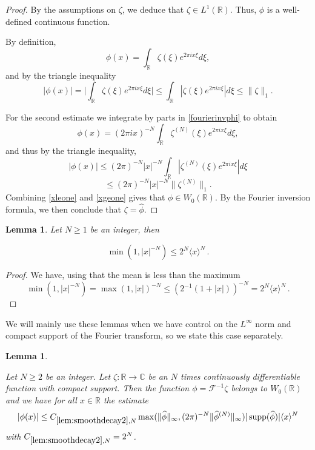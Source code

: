 \documentclass[12pt,reqno]{amsart}
\theoremstyle{plain}
\newtheorem{lemma}[theorem]{Lemma}
\numberwithin{equation}{section}
\theoremstyle{remark}
\newcommand{\uses}[1]{}
\newcommand{\usesdefs}[1]{}
\newcommand{\leanok}{}
\newcommand{\lean}[1]{}
\newcommand{\R}{{\mathbb R}}
\newcommand{\C}{{\mathbb C}}
\DeclareMathOperator{\supp}{supp}
\begin{document}
\begin{proof}
By the assumptions on $\zeta$, we deduce that $\zeta\in L^1(\R)$. Thus, $\phi$ is a well-defined continuous function.

By definition,
\begin{equation}
    \label{fourierinvphi}
    \phi(x) = \int_{\R} \zeta(\xi)e^{2\pi i x\xi} d\xi,
\end{equation}
and  by the triangle inequality
\begin{equation}
    \label{xleone}
    |\phi(x)| = \Big | \int_{\R} \zeta(\xi)e^{2\pi i x\xi} d\xi \Big | \le \int_{\R} |\zeta(\xi)e^{2\pi i x\xi}| d\xi \le \|\zeta\|_1 .
\end{equation}


For the second estimate we integrate by parts  in \eqref{fourierinvphi} to obtain
\[\phi(x) = (2\pi i x)^{-N} \int_{\R} \zeta^{(N)}(\xi) e^{2\pi i x \xi} d\xi, \]
and thus by the triangle inequality,
\[|\phi(x)| \le (2\pi)^{-N}|x|^{-N} \int_{\R}|\zeta^{(N)}(\xi) e^{2\pi i x \xi}| d\xi \]
\begin{equation}
    \label{xgeone}
    \le  (2\pi)^{-N} |x|^{-N} \|\zeta^{(N)}\|_1.
\end{equation}
Combining \eqref{xleone} and \eqref{xgeone} gives that $\phi \in W_0(\R)$. By the Fourier inversion formula, we then conclude that $\zeta=\widehat{\phi}$.
\end{proof}


\begin{lemma}
    \label{lem: min and bracket}\uses{}\usesdefs{bracket bump} Let $N\ge 1$ be an integer, then
\lean{Auto.min_and_bracket}
\leanok
\begin{equation}\label{auto:min-power-bracket-bound}\min(1, |x|^{-N})\le 2^N   \langle x\rangle^{N}\, .\end{equation}
\end{lemma}
\begin{proof}
 We have, using that the mean is less than the maximum
    \[\min(1, |x|^{-N})=\max(1, |x|)^{-N}\le (2^{-1}(1+|x|))^{-N}=2^N  \langle x\rangle^{N}\, .\]
\end{proof}

We will mainly use these lemmas when we have control on the $L^\infty$ norm and compact support of   the Fourier transform, so we state this case separately.

\begin{lemma}
   \label{lem:smoothdecay2}\uses{lem:smoothdecay,lem: min and bracket}\usesdefs{bracket bump,auto:Wiener-space-definition}
\lean{Auto.smoothDecay2}
\leanok
Let $N\geq 2$ be an integer. Let $\zeta:\R\to\C$ be an $N$ times continuously differentiable function with compact support.
Then the function $\phi=\mathcal F^{-1} \zeta$ belongs to $W_0(\R)$ and we have for all $x\in \R$ the estimate
\begin{equation}\label{E:smoothdecay2}
|\phi(x)|\leq C_{\ref{lem:smoothdecay2}, N} \max(\|\widehat{\phi}\|_\infty, (2\pi )^{-N}\|\widehat{\phi}^{(N)}\|_\infty)|\supp (\widehat{\phi})|   \langle x\rangle^{N}
\end{equation}
with $C_{\ref{lem:smoothdecay2}, N}=2^{N} $.
\end{lemma}
\end{document}
